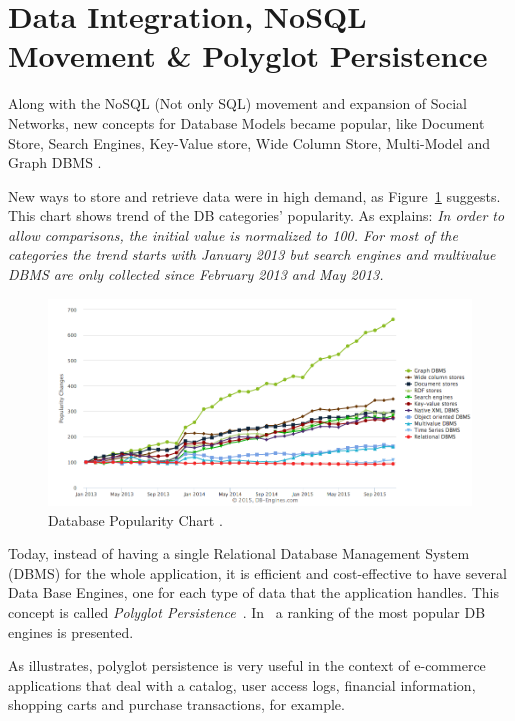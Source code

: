 \section{Data Integration, NoSQL Movement \& Polyglot Persistence}

Along with the NoSQL (Not only SQL) movement and expansion of Social Networks, new concepts for Database Models became popular, like Document Store, Search Engines, Key-Value store, Wide Column Store, Multi-Model and Graph DBMS \cite{dbrankingchart}. 

New ways to store and retrieve data were in high demand, as Figure~\ref{fig:popularityDB} suggests. This chart shows trend of the DB categories' popularity. As \cite{dbrankingchart} explains: \textit{In order to allow comparisons, the initial value is normalized to 100. For most of the categories the trend starts with January 2013 but search engines and multivalue DBMS are only collected since February 2013 and May 2013.}


\begin{figure}[ht!]
\centering
\includegraphics[width=150mm]{popularityDB.png}
\caption{Database Popularity Chart \cite{dbrankingchart}.\label{fig:popularityDB}}
\end{figure}

Today, instead of having a single Relational Database Management System (DBMS) for the whole application, it is efficient and cost-effective to have several Data Base Engines, one for each type of data that the application handles. 
This concept is called \textit{Polyglot Persistence}~\cite{sadalage2012nosql}. In~\cite{dbranking} a ranking of the most popular DB engines is presented.

As \cite{AdressingDataManagementCloud} illustrates, polyglot persistence is very useful in the context of  e-commerce applications that deal with a catalog, user access logs, financial information, shopping carts and purchase transactions, for example.

